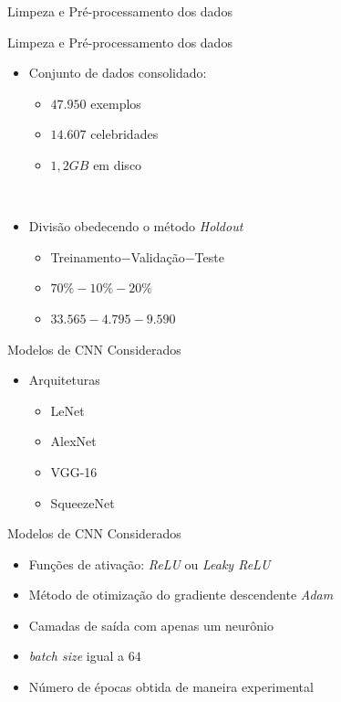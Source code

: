 \begin{frame}{Limpeza e Pré-processamento dos dados}
\begin{itemize}
\begin{figure}[!ht]
\begin{subfigure}[h]{0.4\linewidth}
          	\end{subfigure}
          \end{figure}
     \end{itemize}
\end{frame}

\begin{frame}{Limpeza e Pré-processamento dos dados}
     \begin{itemize}
          \item Conjunto de dados consolidado:
          \begin{itemize}
               \item $47.950$ exemplos
               \item $14.607$ celebridades
               \item $1,2 GB$ em disco
          \end{itemize}
          \ \ \newline
          \item Divisão obedecendo o método \emph{Holdout}
          \begin{itemize}
               \item Treinamento$-$Validação$-$Teste
               \item $70\%-10\%-20\%$
               \item $33.565-4.795-9.590$
          \end{itemize}
     \end{itemize}
\end{frame}

\begin{frame}{Modelos de CNN Considerados}
     \begin{itemize}
          \item Arquiteturas
          \begin{itemize}
            \item LeNet
            \item AlexNet
            \item VGG-16
            \item SqueezeNet
          \end{itemize}
     \end{itemize}
\end{frame}

\begin{frame}{Modelos de CNN Considerados}
     \begin{itemize}
          \item Funções de ativação: \emph{ReLU} ou \emph{Leaky ReLU}
          \item Método de otimização do gradiente descendente \emph{Adam}
          \ \ \newline
          \item Camadas de saída com apenas um neurônio
          \item \emph{batch size} igual a $64$
          \item Número de épocas obtida de maneira experimental
     \end{itemize}
\end{frame}
